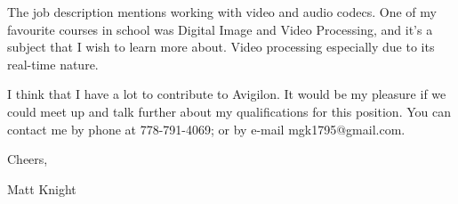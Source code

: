 \documentclass[letterpaper,12pt]{article}
\begin{document}
\vspace{1 em}
The job description mentions working with video and audio codecs. One of my
favourite courses in school was Digital Image and Video Processing, and it's a
subject that I wish to learn more about. Video processing especially due to its
real-time nature.

\vspace{1 em}

I think that I have a lot to contribute to Avigilon. It would be my pleasure
if we could meet up and talk further about my qualifications for this position.
You can contact me by phone at 778-791-4069; or by e-mail mgk1795@gmail.com.

\vspace{1 em}
Cheers,

Matt Knight
\end{document}
